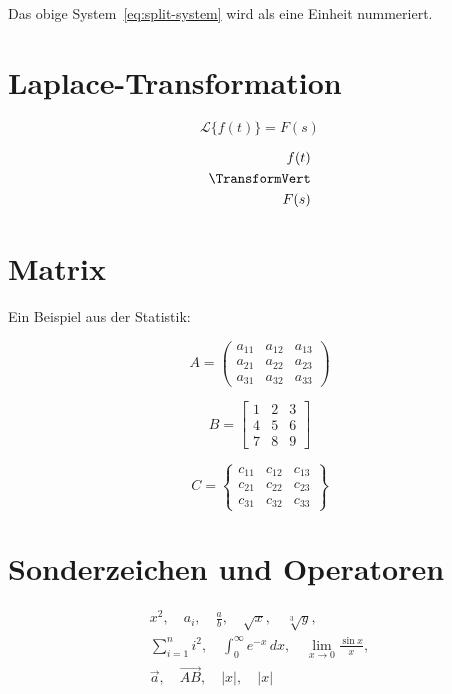 \documentclass[a4paper,12pt]{article}
\begin{document}
\noindent Das obige System~\eqref{eq:split-system} wird als eine Einheit nummeriert.

\section{Laplace-Transformation}
\[
\mathcal{L}\{f(t)\} = F(s)
\]

\[
\begin{aligned}
f(t)\\
\TransformVert\\
F(s)
\end{aligned}
\]

\section{Matrix}
\noindent Ein Beispiel aus der Statistik:

\[
A = \begin{pmatrix}
  a_{11} & a_{12} & a_{13} \\
  a_{21} & a_{22} & a_{23} \\
  a_{31} & a_{32} & a_{33}
\end{pmatrix}
\]

\[
B = \begin{bmatrix}
  1 & 2 & 3 \\
  4 & 5 & 6 \\
  7 & 8 & 9
\end{bmatrix}
\]

\[
C = \left\{
\begin{matrix}
c_{11} & c_{12} & c_{13} \\
c_{21} & c_{22} & c_{23} \\
c_{31} & c_{32} & c_{33}
\end{matrix}
\right\}
\]

\section{Sonderzeichen und Operatoren}

\[
\begin{aligned}
x^2, \quad a_i, \quad \frac{a}{b}, \quad \sqrt{x}, \quad \sqrt[3]{y}, \\ %
\sum_{i=1}^n i^2, \quad \int_0^\infty e^{-x}\,dx, \quad %
\lim_{x\to0} \frac{\sin x}{x}, \\ %
\vec{a}, \quad \overrightarrow{AB}, \quad |x|, \quad \lvert x \rvert %
\end{aligned}
\]
\end{document}
